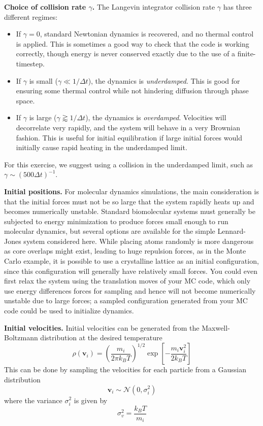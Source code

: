 \documentclass[aip,jcp,preprint,superscriptaddress,floatfix]{revtex4-1}
\begin{document}
\textbf{Choice of collision rate $\gamma$.}
The Langevin integrator collision rate $\gamma$ has three different regimes:
\begin{itemize}
\setlength{\itemsep}{0em} %
\item If $\gamma = 0$, standard Newtonian dynamics is recovered, and no thermal control is applied. This is sometimes a good way to check that the code is working correctly, though energy is never conserved exactly due to the use of a finite-timestep.
\item If $\gamma$ is small ($\gamma \ll 1/\Delta t$), the dynamics is \emph{underdamped}. This is good for ensuring some thermal control while not hindering diffusion through phase space.
\item If $\gamma$ is large ($\gamma \gtrapprox 1/\Delta t$), the dynamics is \emph{overdamped}. Velocities will decorrelate very rapidly, and the system will behave in a very Brownian fashion. This is useful for initial equilibration if large initial forces would initially cause rapid heating in the underdamped limit.
\end{itemize}
For this exercise, we suggest using a collision in the underdamped limit, such as $\gamma \sim (500 \Delta t)^{-1}$.
 
\textbf{Initial positions.} 
For molecular dynamics simulations, the main consideration is that the initial forces must not be so large that the system rapidly heats up and becomes numerically unstable.
Standard biomolecular systems must generally be subjected to energy minimization to produce forces small enough to run molecular dynamics, but several options are available for the simple Lennard-Jones system considered here.
While placing atoms randomly is more dangerous as core overlaps might exist, leading to huge repulsion forces, as in the Monte Carlo example, it is possible to use a crystalline lattice as an initial configuration, since this configuration will generally have relatively small forces. 
You could even first relax the system using the translation moves of your MC code, which only use energy differences forces for sampling and hence will not become numerically unstable due to large forces; a sampled configuration generated from your MC code could be used to initialize dynamics.

\textbf{Initial velocities.} 
Initial velocities can be generated from the Maxwell-Boltzmann distribution at the desired temperature
\begin{equation}
	\rho \left(\mathbf{v}_i\right) = \left( \frac{m_i}{2 \pi k_B T} \right)^{1/2} \exp \left[ - \frac{m_i \mathbf{v}_i^2 } {2 k_B T }  \right]
\end{equation}
This can be done by sampling the velocities for each particle from a Gaussian distribution
\begin{equation}
       \mathbf{v}_i \sim \mathcal{N}(0, \sigma_i^2)
\end{equation}
where the variance $\sigma_i^2$ is given by
\begin{equation}
	\sigma_v^2 = \frac{k_B T}{m_i}
\end{equation}
\end{document}
